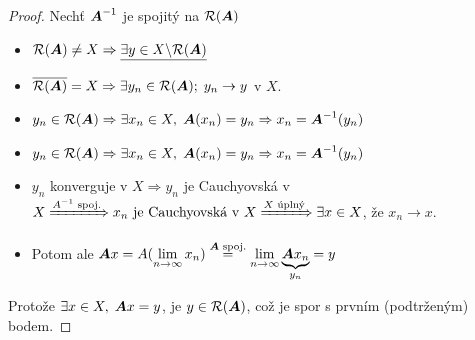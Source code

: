 \begin{proof}
    Nechť $\boldsymbol{A}^{-1}$ je spojitý na $\mathcal{R}(\boldsymbol{A})$
    \begin{itemize}
        \item $\mathcal{R}(\boldsymbol{A}) \neq X \Rightarrow \underline{\exists y\in X\backslash \mathcal{R}(\boldsymbol{A})}$
        \item $\overline{\mathcal{R}(\boldsymbol{A})}=X \Rightarrow \exists y_n\in\mathcal{R}(\boldsymbol{A});\; y_n\rightarrow y$ v $X$.
        \item $y_n\in\mathcal{R}(\boldsymbol{A}) \Rightarrow \exists x_n\in X, \;\boldsymbol{A}(x_n)=y_n \Rightarrow x_n=\boldsymbol{A}^{-1}(y_n)$
        \item $y_n\in\mathcal{R}(\boldsymbol{A})\Rightarrow \exists x_n\in X,\; \boldsymbol{A}(x_n)=y_n \Rightarrow x_n=\boldsymbol{A}^{-1}(y_n)$
        \item $y_n$ konverguje v $X \Rightarrow y_n$ je Cauchyovská v $X \xRightarrow{A^{-1} \text{ spoj.}} x_n \text{ je Cauchyovská v } X \xRightarrow{X \text{ úplný}} \exists x\in X$, že  $x_n\rightarrow x$.
        \item Potom ale $\boldsymbol{A}x=A(\lim\limits_{n\rightarrow \infty} x_n)\overset{\boldsymbol{A} \text{ spoj.}}{=} \lim\limits_{n\rightarrow \infty} \underbrace{\boldsymbol{A}x_n}_{y_n} =y$
    \end{itemize}
Protože $\exists x\in X,\; \boldsymbol{A}x=y$, je $y\in\mathcal{R}(\boldsymbol{A})$, což je spor s prvním (podtrženým) bodem.
\end{proof}


